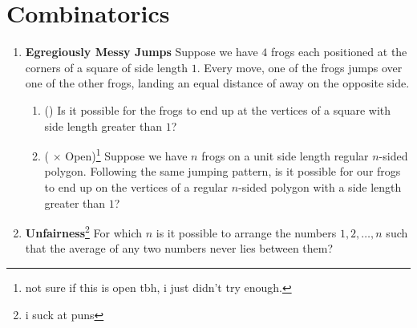 \documentclass[11pt]{scrartcl}
\begin{document}
\section{Combinatorics}
\begin{enumerate}[label=\textbf{C\arabic*}.]
    \item \textbf{Egregiously Messy Jumps} \newline
    Suppose we have $4$ frogs each positioned at the corners of a square of side length $1$. Every move, one of the frogs jumps over one of the other frogs, landing an equal distance of away on the opposite side.
    
    \begin{enumerate}
        \item (\fullchili) Is it possible for the frogs to end up at the vertices of a square with side length greater than $1$?
        
        \item (\fullchili \hspace{1pt} $\times$ Open)\footnote{not sure if this is open tbh, i just didn't try enough.} Suppose we have $n$ frogs on a unit side length regular $n$-sided polygon. Following the same jumping pattern, is it possible for our frogs to end up on the vertices of a regular $n$-sided polygon with a side length greater than $1$?
    \end{enumerate}
    
    \item \textbf{Unfairness}\footnote{i suck at puns} \newline
    For which $n$ is it possible to arrange the numbers $1, 2, \dots, n$ such that the average of any two numbers never lies between them?
    
\end{enumerate}

\newpage
\end{document}
